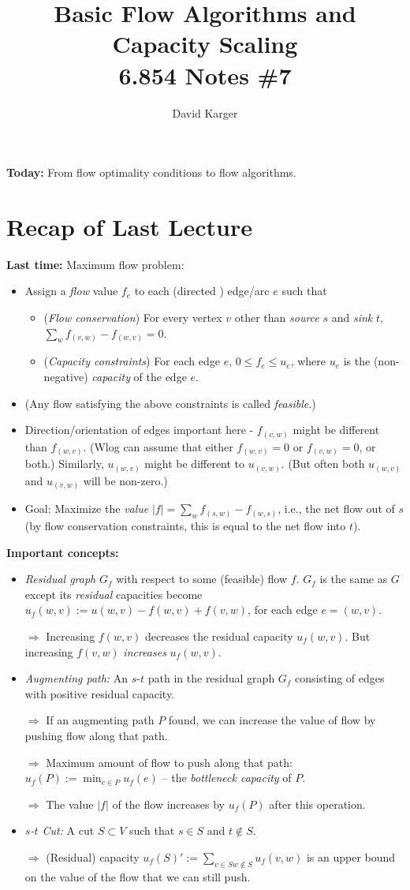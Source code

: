 \documentclass{article}
\title{Basic Flow Algorithms and Capacity Scaling\\ 6.854 Notes \#7}
\author{David Karger}
\begin{document}
{\bf Today:} From flow optimality conditions to flow algorithms. 

\section{Recap of Last Lecture}

\textbf{Last time:} Maximum flow problem:
\begin{itemize}
\item Assign a \emph{flow} value $f_e$ to each (directed ) edge/arc $e$ such that
\begin{itemize}
\item (\emph{Flow conservation}) For every vertex $v$ other than {\em source} $s$ and {\em sink} $t$, $\sum_w f_{(v,w)}-f_{(w,v)}=0$.
\item (\emph{Capacity constraints}) For each edge $e$, $0\leq f_e \leq u_e$, where $u_e$ is the (non-negative) {\em capacity} of the edge $e$. 
\end{itemize}
\item (Any flow satisfying the above constraints is called {\em feasible}.)
\item {} Direction/orientation of edges important here - $f_{(v, w)}$ might be different than $f_{(w, v)}$.  (Wlog can assume that either $f_{(w, v)}=0$ or $f_{(v, w)}=0$, or both.) Similarly, $u_{(w, v)}$ might be different to $u_{(v, w)}$. (But often both $u_{(w,v)}$ and $u_{(v,w)}$ will be non-zero.)
\item Goal: Maximize the \emph{value} $|f| = \sum_w f_{(s,w)}-f_{(w,s)}$, i.e., the net flow out of $s$ (by flow conservation constraints, this is equal to the net flow into $t$).
\end{itemize}

\textbf{Important concepts:} 

\begin{itemize}
\item {\em Residual graph} $G_f$ with respect to some (feasible) flow $f$. $G_f$ is the same as $G$ except its {\em residual} capacities become $u_f(w,v):= u(w,v) - f(w, v) + f(v, w)$, for each edge $e=(w,v)$.

$\Rightarrow$ Increasing $f(w,v)$ decreases the residual capacity $u_f(w,v)$. But increasing $f(v,w)$ {\em increases} $u_f(w,v)$. 
\item {\em Augmenting path:} An $s$-$t$ path in the residual graph $G_f$ consisting of edges with positive residual capacity.

$\Rightarrow$ If an augmenting path $P$ found, we can increase the value of flow by pushing flow along that path. 

$\Rightarrow$ Maximum amount of flow to push along that path: $u_f(P):=\min_{e\in P} u_f(e)$ -- the {\em bottleneck capacity} of $P$.

$\Rightarrow$ The value $|f|$ of the flow increases by $u_f(P)$ after this operation. 
\item {\em $s$-$t$ Cut:} A cut $S\subset V$ such that $s\in S$ and $t\notin S$.

$\Rightarrow$ (Residual) capacity $u_f(S)':= \sum_{v\in S w\notin S} u_f(v,w)$ is an upper bound on the value of the flow that we can still push.  
\end{itemize}
\end{document}
